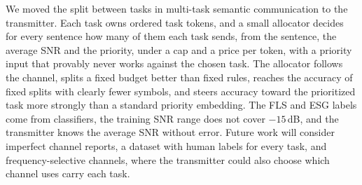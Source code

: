 We moved the split between tasks in multi-task semantic communication
to the transmitter. Each task owns ordered task tokens, and a small
allocator decides for every sentence how many of them each task sends,
from the sentence, the average SNR and the priority, under a cap and a
price per token, with a priority input that provably never works
against the chosen task. The allocator follows the channel, splits a
fixed budget better than fixed rules, reaches the accuracy of fixed
splits with clearly fewer symbols, and steers accuracy toward the
prioritized task more strongly than a standard priority embedding. The
FLS and ESG labels come from classifiers, the training SNR range does
not cover $-15$\,dB, and the transmitter knows the average SNR without
error. Future work will consider imperfect channel reports, a dataset
with human labels for every task, and frequency-selective channels,
where the transmitter could also choose which channel uses carry each
task.

